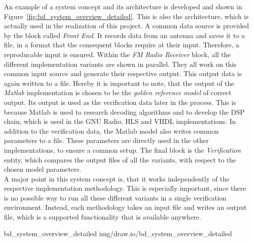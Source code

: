 An example of a system concept and its architecture is developed and shown in Figure~\ref{fig:bd_system_overview_detailed}.
This is also the architecture, which is actually used in the realization of this project.
A common data source is provided by the block called \textit{Front End}.
It records data from an antenna and saves it to a file, in a format that the consequent blocks require at their input.
Therefore, a reproducable input is ensured.
Within the \textit{FM Radio Receiver} block, all the different implementation variants are shown in parallel.
They all work on this common input source and generate their respective output.
This output data is again written to a file.
Hereby it is important to note, that the output of the \textit{Matlab} implementation is chosen to be the \textit{golden reference model} of correct output.
Its output is used as the verification data later in the process.
This is because Matlab is used to research decoding algorithms and to develop the DSP chain, which is used in the GNU Radio, HLS and VHDL implementations.
In addition to the verification data, the Matlab model also writes common parameters to a file.
These parameters are directly used in the other implementations, to ensure a common setup.
The final block is the \textit{Verification} entity, which compares the output files of all the variants, with respect to the chosen model parameters.\\

A major point in this system concept is, that it works independently of the respective implementation methodology.
This is especially important, since there is no possible way to run all these different variants in a single verification environment.
Instead, each methodology takes an input file and writes an output file, which is a supported functionality that is available anywhere.

 {bd_system_overview_detailed} {img/draw.io/bd_system_overview_detailed}

